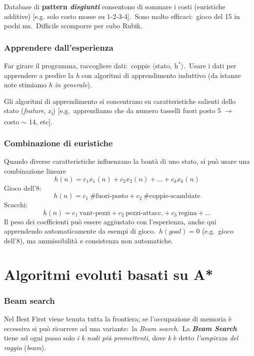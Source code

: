 Database di \textbf{pattern \textit{disgiunti}} consentono di sommare i costi (euristiche additive) [e.g. solo costo mosse su 1-2-3-4].\
Sono molto efficaci:\ gioco del 15 in pochi ms.\
Difficile scomporre per cubo Rubik.

\subsubsection{Apprendere dall'esperienza}

Far girare il programma, raccogliere dati:\ coppie $\langle \mathrm{stato},\ \mathrm{h^*} \rangle$.\
Usare i dati per apprendere a predire la \textit{h} con algoritmi di apprendimento induttivo (da istanze note stimiamo \textit{h in generale}).

Gli algoritmi di apprendimento si concentrano su caratteristiche salienti dello stato (\textit{feature}, \textit{x\textsubscript{i}}) [e.g.\ apprendiamo che da numero tasselli fuori posto 5 $\rightarrow$ costo $\sim$ 14, etc].

\subsubsection{Combinazione di euristiche}

Quando diverse caratteristiche influenzano la bontà di uno stato, si può usare una combinazione lineare
\[
	h(n)= c_1 x_1 (n) + c_2 x_2 (n) + \dots + c_k x_k (n)
\]
Gioco dell'8:
\[
	h(n)= c_1\ \#\mathrm{fuori\textrm{-}posto} + c_2\ \#\mathrm{coppie\textrm{-}scambiate}
\]
Scacchi:
\[
	h(n)= c_1\ \mathrm{vant\textrm{-}pezzi} + c_2\ \mathrm{pezzi\textrm{-}attacc.} + c_3\ \mathrm{regina} + \dots
\]
Il peso dei coefficienti può essere aggiustato con l'esperienza, anche qui apprendendo automaticamente da esempi di gioco.\
$h(goal) =0$ (e.g.\ gioco dell'8), ma ammissibilità e consistenza non automatiche.

\section{Algoritmi evoluti basati su A*}

\subsubsection{Beam search}

Nel Best First viene tenuta tutta la frontiera; se l'occupazione di memoria è eccessiva si può ricorrere ad una variante:\ la \textit{Beam search}.\
La \textbf{\textit{Beam Search}} tiene ad ogni passo solo \textit{i k nodi più promettenti}, dove \textit{k} è detto \textit{l'ampiezza del raggio} (\textit{beam}).

